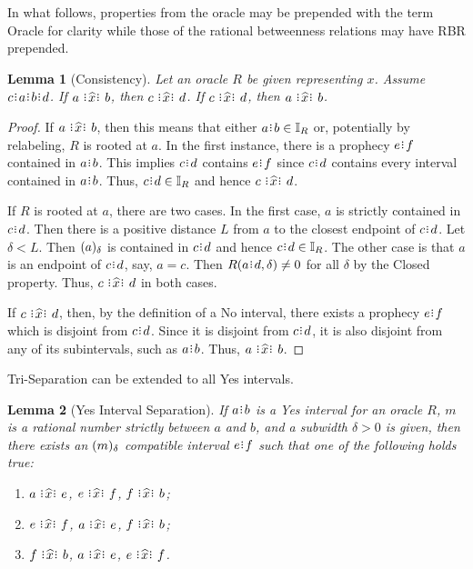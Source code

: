 \documentclass[12pt]{article}
\newtheorem{lemma}{Lemma}[section]
\begin{document}
In what follows, properties from the oracle may be prepended with the term Oracle for clarity while those of the rational betweenness relations may have RBR prepended. 

\begin{lemma}[Consistency]\label{os-con}
    Let an oracle $R$ be given representing $x$. Assume $c\rint a\rint b\rint d$. If $a \xora b$, then $c \xora d$. If \sout{$c \xora d$}, then \sout{$a \xora b$}. 
\end{lemma}

\begin{proof}
    If $a \xora b$, then this means that either $a\rint b \in \mathbb{I}_R$ or, potentially by relabeling, $R$ is rooted at $a$. In the first instance, there is a prophecy $e\rint f$ contained in $a\rint b$. This implies $c\rint d$ contains $e\rint f$ since $c\rint d$ contains every interval contained in $a\rint b$. Thus, $c\rint d \in \mathbb{I}_R$ and hence $c \xora d$. 
    
    If $R$ is rooted at $a$, there are two cases. In the first case, $a$ is strictly contained in $c\rint d$. Then there is a positive distance $L$ from $a$ to the closest endpoint of $c\rint d$. Let $\delta < L$. Then $(a)_{\delta}$ is contained in $c\rint d$ and hence $c\rint d \in \mathbb{I}_R$. The other case is that $a$ is an endpoint of $c\rint d$, say, $ a= c$. Then $R(a\rint d, \delta) \neq 0$ for all $\delta$ by the Closed property. Thus, $c \xora d$ in both cases.  

    If \sout{$c \xora d$}, then, by the definition of a No interval, there exists a prophecy $e\rint f$ which is disjoint from $c\rint d$. Since it is disjoint from $c\rint d$, it is also disjoint from any of its subintervals, such as $a\rint b$. Thus, \sout{$a \xora b$}.    
\end{proof}

Tri-Separation can be extended to all Yes intervals.

\begin{lemma}[Yes Interval Separation]
    If $a\rint  b$ is a Yes interval for an oracle $R$, $m$ is a rational number strictly between $a$ and $b$, and a subwidth $\delta > 0$ is given, then there exists an $(m)_{\delta}$ compatible interval $e\rint f$ such that one of the following holds true: 
    \begin{enumerate}
        \item $a \xora e$, \sout{$e\xora f$}, \sout{$f\xora b$};
        \item $e \xora f$, \sout{$a\xora e$}, \sout{$f\xora b$};
        \item $f \xora b$, \sout{$a\xora e$}, \sout{$e\xora f$}.
    \end{enumerate}
\end{lemma}
\end{document}
